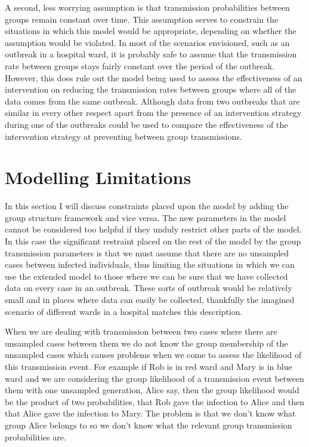 \documentclass[11pt,a4paper]{report}
\begin{document}
A second, less worrying assumption is that transmission probabilities between groups remain constant over time. This assumption serves to constrain the situations in which this model would be appropriate, depending on whether the assumption would be violated. In most of the scenarios envisioned, such as an outbreak in a hospital ward, it is probably safe to assume that the transmission rate between groups stays fairly constant over the period of the outbreak. However, this does rule out the model being used to assess the effectiveness of an intervention on reducing the transmission rates between groups where all of the data comes from the same outbreak. Although data from two outbreaks that are similar in every other respect apart from the presence of an intervention strategy during one of the outbreaks could be used to compare the effectiveness of the intervention strategy at preventing between group transmissions.


\section{Modelling Limitations}
In this section I will discuss constraints placed upon the model by adding the group structure framework and vice versa. The new parameters in the model cannot be considered too helpful if they unduly restrict other parts of the model. In this case the significant restraint placed on the rest of the model by the group transmission parameters is that we must assume that there are no unsampled cases between infected individuals, thus limiting the situations in which we can use the extended model to those where we can be sure that we have collected data on every case in an outbreak. These sorts of outbreak would be relatively small and in places where data can easily be collected, thankfully the imagined scenario of different wards in a hospital matches this description.

When we are dealing with transmission between two cases where there are unsampled cases between them we do not know the group membership of the unsampled cases which causes problems when we come to assess the likelihood of this transmission event. For example if Rob is in red ward and Mary is in blue ward and we are considering the group likelihood of a transmission event between them with one unsampled generation, Alice say, then the group likelihood would be the product of two probabilities, that Rob gave the infection to Alice and then that Alice gave the infection to Mary. The problem is that we don't know what group Alice belongs to so we don't know what the relevant group transmission probabilities are.
\end{document}
